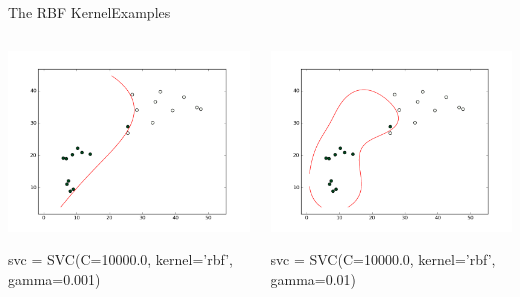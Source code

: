 \documentclass[xcolor=dvipsnames]{beamer}
\begin{document}
\begin{frame}{The RBF Kernel}{Examples}
    \begin{columns}
        \begin{column}{0.5\textwidth}
            \begin{center}
                \includegraphics[width=\textwidth]{figs/gamma_1e-3.png}
            \end{center}
            svc = SVC(C=10000.0, kernel='rbf', gamma=0.001)
        \end{column}
        \begin{column}{0.5\textwidth}
            \begin{center}
                \includegraphics[width=\textwidth]{figs/gamma_1e-2.png}
            \end{center}
            svc = SVC(C=10000.0, kernel='rbf', gamma=0.01)
        \end{column}
    \end{columns}
\end{frame}
\end{document}
